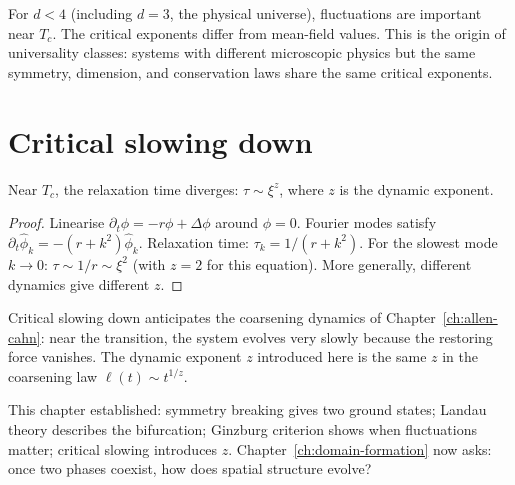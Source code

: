 \begin{TechNote}
  For $d < 4$ (including $d = 3$, the physical universe),
  fluctuations are important near $T_c$.
  The critical exponents differ from mean-field values.
  This is the origin of universality classes: systems with
  different microscopic physics but the same symmetry, dimension,
  and conservation laws share the same critical exponents.
\end{TechNote}

\section{Critical slowing down}

\begin{theorem}
  \label{thm:critical-slow}
  \statusproven{}
  Near $T_c$, the relaxation time diverges:
  $\tau \sim \xi^z$,
  where $z$ is the dynamic exponent.
\end{theorem}

\begin{proof}
  Linearise $\partial_t\phi = -r\phi + \Delta\phi$ around $\phi = 0$.
  Fourier modes satisfy
  $\partial_t\hat\phi_k = -(r + k^2)\hat\phi_k$.
  Relaxation time: $\tau_k = 1/(r+k^2)$.
  For the slowest mode $k \to 0$: $\tau \sim 1/r \sim \xi^2$
  (with $z = 2$ for this equation).
  More generally, different dynamics give different $z$.
\end{proof}

\begin{ForwardRef}
  Critical slowing down anticipates the coarsening dynamics
  of Chapter~\ref{ch:allen-cahn}: near the transition, the
  system evolves very slowly because the restoring force
  vanishes.
  The dynamic exponent $z$ introduced here is the same $z$
  in the coarsening law $\ell(t) \sim t^{1/z}$.
\end{ForwardRef}

\begin{ChapterConnection}
  This chapter established: symmetry breaking gives two
  ground states; Landau theory describes the bifurcation;
  Ginzburg criterion shows when fluctuations matter;
  critical slowing introduces $z$.
  Chapter~\ref{ch:domain-formation} now asks: once two
  phases coexist, how does spatial structure evolve?
\end{ChapterConnection}

